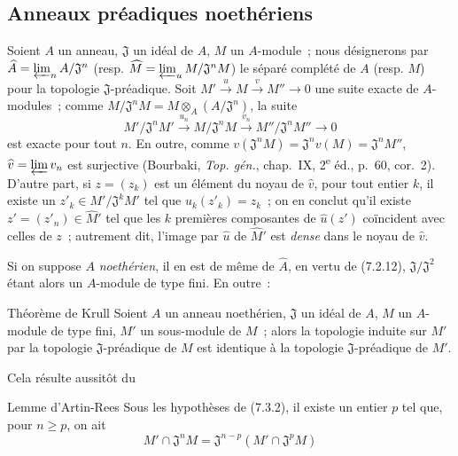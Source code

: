 \subsection{Anneaux préadiques noethériens}
\label{subsection:0.7.3-fr}

\begin{env}[7.3.1]
\label{0.7.3.1-fr}
Soient $A$ un anneau, $\mathfrak J$ un idéal de $A$, $M$ un $A$-module~;
nous désignerons par
$\widehat A=\varprojlim_n A/\mathfrak J^n$ (resp.
$\widehat M=\varprojlim_u M/\mathfrak J^nM$) le séparé complété de $A$
(resp. $M$) pour la topologie $\mathfrak J$-préadique. Soit
$M'\xrightarrow{u}M\xrightarrow{v}M''\to0$
une suite exacte de $A$-modules~; comme
$M/\mathfrak J^nM=M\otimes_A(A/\mathfrak J^n)$, la suite
\[
  M'/\mathfrak J^nM'\xrightarrow{u_n}
  M/\mathfrak J^nM\xrightarrow{v_n}
  M''/\mathfrak J^nM''\to0
\]
est exacte pour tout $n$. En outre, comme
$v(\mathfrak J^nM)=\mathfrak J^nv(M)=\mathfrak J^nM''$,
$\widehat v=\varprojlim v_n$ est surjective (Bourbaki,
\emph{Top. gén.}, chap.~IX, 2\textsuperscript{e} éd., p.~60, cor.~2).
D'autre part, si $z=(z_k)$ est un élément du noyau de $\widehat v$, pour tout
entier $k$, il existe un $z'_k\in M'/\mathfrak J^kM'$ tel que
$u_k(z'_k)=z_k$~; on en conclut qu'il existe
$z'=(z'_n)\in\widehat{M}'$ tel que les $k$ premières composantes de
$\widehat u(z')$ coïncident avec celles de $z$~; autrement dit, l'image par
$\widehat u$ de $\widehat{M}'$ est \emph{dense} dans le noyau de
$\widehat v$.

Si on suppose $A$ \emph{noethérien}, il en est de même de $\widehat A$, en
vertu de (7.2.12), $\mathfrak J/\mathfrak J^2$ étant alors un $A$-module de
type fini. En outre~:
\end{env}

\begin{namedtheorem}[7.3.2]{Théorème de Krull}
\label{0.7.3.2-fr}
Soient $A$ un anneau \textup{noethérien}, $\mathfrak J$ un idéal de $A$, $M$ un
$A$-module \textup{de type fini}, $M'$ un sous-module de $M$~; alors la topologie
induite sur $M'$ par la topologie $\mathfrak J$-préadique de $M$ est identique
à la topologie $\mathfrak J$-préadique de $M'$.
\end{namedtheorem}

Cela résulte aussitôt du

\begin{namedlemma}[7.3.2.1]{Lemme d'Artin-Rees}
\label{0.7.3.2.1-fr}
Sous les hypothèses de \textup{(7.3.2)}, il existe un entier $p$ tel que, pour
$n\geq p$, on ait
\[
  M'\cap\mathfrak J^nM=\mathfrak J^{n-p}
  (M'\cap\mathfrak J^pM)
\]
\end{namedlemma}

